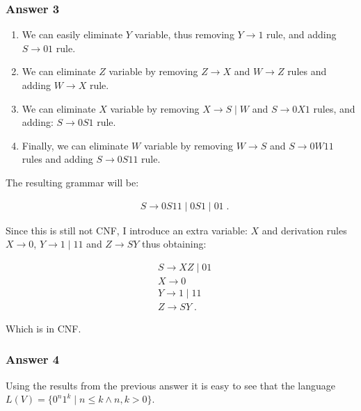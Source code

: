 \documentclass[11pt]{article}
\begin{document}
\subsubsection{Answer 3}
\label{sec-1-2-1}
\begin{enumerate}
\item We can easily eliminate $Y$ variable, thus removing $Y \to 1$ rule,
and adding $S \to 01$ rule.
\item We can eliminate $Z$ variable by removing $Z \to X$ and $W \to Z$ rules
and adding $W \to X$ rule.
\item We can eliminate $X$ variable by removing $X \to S \;|\; W$ and $S \to
       0X1$ rules, and adding: $S \to 0S1$ rule.
\item Finally, we can eliminate $W$ variable by removing $W \to S$ and $S \to
       0W11$ rules and adding $S \to 0S11$ rule.
\end{enumerate}


The resulting grammar will be:

\begin{align*}
  &S \to 0S11 \;|\; 0S1 \;|\; 01 \;.
\end{align*}


Since this is still not CNF, I introduce an extra variable: $X$ and
derivation rules $X \to 0$, $Y \to 1 \;|\; 11$ and $Z \to SY$ thus
obtaining:

\begin{align*}
  &S \to XZ \;|\; 01 \\
  &X \to 0 \\
  &Y \to 1 \;|\; 11 \\
  &Z \to SY \;.
\end{align*}


Which is in CNF.

\subsubsection{Answer 4}
\label{sec-1-2-2}
Using the results from the previous answer it is easy to see that
the language $L(V)=\{0^n1^k \;|\; n \leq k \land n,k > 0\}$.
\end{document}
